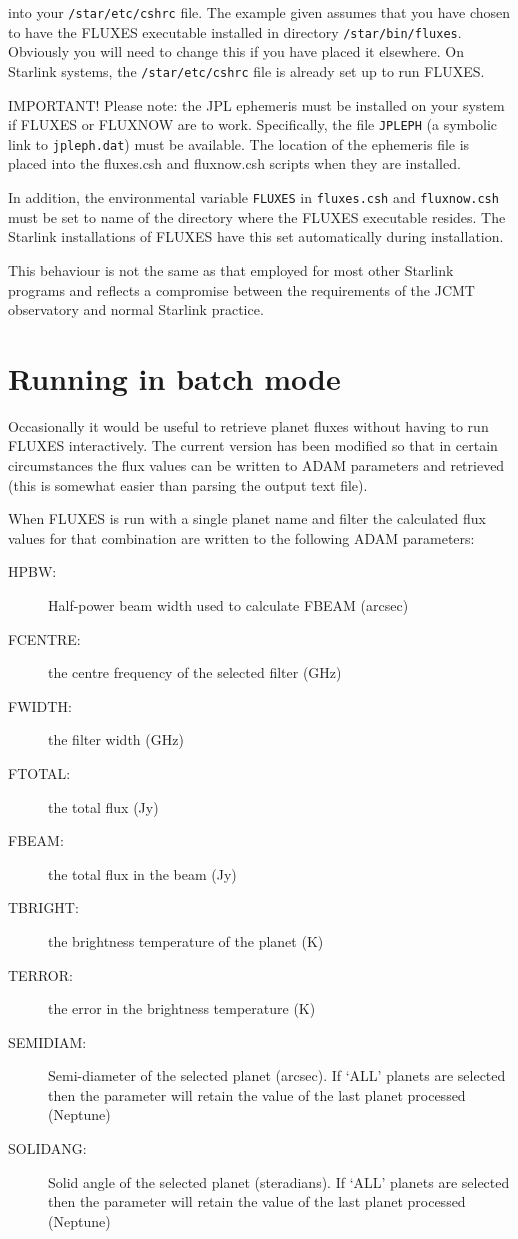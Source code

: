 \documentclass[11pt,twoside]{article}
\newcommand{\xref}[3]{#1}
\newcommand{\xlabel}[1]{}
\renewcommand{\_}{\texttt{\symbol{95}}}
\begin{document}
into your {\tt{/star/etc/cshrc}} file.  The example given assumes that
you have chosen to have the FLUXES executable installed in directory
{\tt{/star/bin/fluxes}}.  Obviously you will need to change this if you
have placed it elsewhere.   On Starlink systems, the
{\tt{/star/etc/cshrc}} file is already set up to run FLUXES.

IMPORTANT! Please note: the \xref{JPL ephemeris}{sun87}{} must be installed
on your system if FLUXES or FLUXNOW are to work. Specifically, the file
{\tt{JPLEPH}} (a symbolic link to {\tt{jpleph.dat}}) must be available.
The location of the ephemeris file is placed into the fluxes.csh and
fluxnow.csh scripts when they are installed.

In addition, the environmental variable {\tt{FLUXES}} in {\tt{fluxes.csh}}
and {\tt{fluxnow.csh}} must be set to name of the directory where the FLUXES
executable resides.  The Starlink installations of FLUXES have this set
automatically during installation.

This behaviour is not the same as that employed for most other Starlink
programs and reflects a compromise between the requirements of the JCMT
observatory and normal Starlink practice.


\section{Running in batch mode}
\xlabel{batch_mode}
\label{sec:batchmode}

Occasionally it would be useful to retrieve planet fluxes without having
to run FLUXES interactively. The current version has been modified so that
in certain circumstances the flux values can be written to ADAM parameters
and retrieved (this is somewhat easier than parsing the output text file).

When FLUXES is run with a single planet name and filter the calculated
flux values for that combination are written to the following
ADAM parameters:

\begin{description}
\item[HPBW:] Half-power beam width used to calculate F\_BEAM (arcsec)
\item[F\_CENTRE:] the centre frequency of the selected filter (GHz)
\item[F\_WIDTH:] the filter width (GHz)
\item[F\_TOTAL:] the total flux (Jy)
\item[F\_BEAM:] the total flux in the beam (Jy)
\item[T\_BRIGHT:] the brightness temperature of the planet (K)
\item[T\_ERROR:] the error in the brightness temperature (K)
\item[SEMI\_DIAM:] Semi-diameter of the selected planet (arcsec).
If `ALL' planets are selected then the parameter will retain the
value of the last planet processed (Neptune)
\item[SOLID\_ANG:] Solid angle of the selected planet (steradians).
If `ALL' planets are selected then the parameter will retain the
value of the last planet processed (Neptune)
\end{description}
\end{document}
